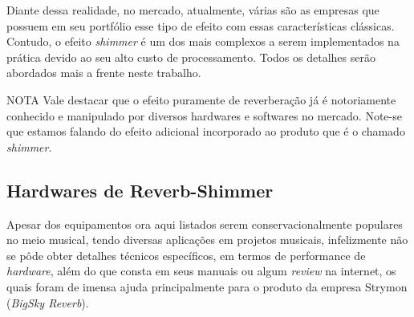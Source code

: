 		Diante dessa realidade, no mercado, atualmente, várias são as empresas que possuem em seu portfólio esse tipo de efeito com essas características clássicas. Contudo, o efeito \textit{shimmer} é um dos mais complexos a serem implementados na prática devido ao seu alto custo de processamento. Todos os detalhes serão abordados mais a frente neste trabalho.
		
		\begin{mymdframed}{NOTA}
			Vale destacar que o efeito puramente de reverberação já é notoriamente conhecido e manipulado por diversos hardwares e softwares no mercado. Note-se que estamos falando do efeito adicional incorporado ao produto que é o chamado \textit{shimmer}.
		\end{mymdframed}
	
		\subsection{Hardwares de Reverb-Shimmer}
			
			Apesar dos equipamentos ora aqui listados serem conservacionalmente populares no meio musical, tendo diversas aplicações em projetos musicais, infelizmente não se pôde obter detalhes técnicos específicos, em termos de performance de \textit{hardware}, além do que consta em seus manuais ou algum \textit{review} na internet, os quais foram de imensa ajuda principalmente para o produto da empresa Strymon (\textit{BigSky Reverb}).
			
